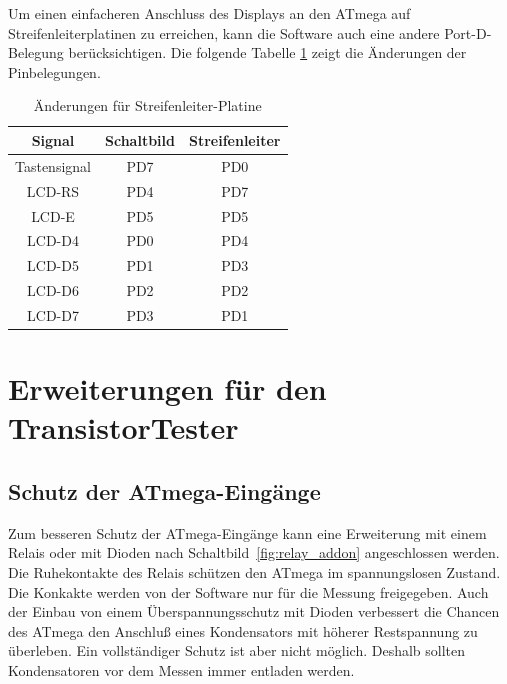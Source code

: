 Um einen einfacheren Anschluss des Displays an den ATmega auf Streifenleiterplatinen zu erreichen,
kann die Software auch eine andere Port-D-Belegung berücksichtigen.
Die folgende Tabelle \ref{tab:grid-change} zeigt die Änderungen der Pinbelegungen.

\begin{table}[H]
  \begin{center}
    \begin{tabular}{| c | c | c |}
    \hline
       Signal & Schaltbild & Streifenleiter\\
    \hline
    Tastensignal  &  PD7   &  PD0 \\
    LCD-RS    &  PD4      & PD7 \\
    LCD-E     &  PD5   & PD5 \\
    LCD-D4    &  PD0   & PD4 \\
    LCD-D5    &  PD1   & PD3 \\
    LCD-D6    &  PD2   & PD2 \\
    LCD-D7    &  PD3   & PD1 \\
    \hline
    \end{tabular}
  \end{center}
  \caption{Änderungen für Streifenleiter-Platine}
  \label{tab:grid-change}
\end{table}

\section{Erweiterungen für den TransistorTester}


\subsection{Schutz der ATmega-Eingänge}  

Zum besseren Schutz der ATmega-Eingänge kann eine Erweiterung mit einem Relais oder mit Dioden
nach Schaltbild~\ref{fig:relay_addon} angeschlossen werden.
Die Ruhekontakte des Relais schützen den ATmega im spannungslosen Zustand.
Die Konkakte werden von der Software nur für die Messung freigegeben.
Auch der Einbau von einem Überspannungsschutz mit Dioden verbessert die Chancen des ATmega
den Anschluß eines Kondensators mit höherer Restspannung zu überleben.
Ein vollständiger Schutz ist aber nicht möglich. Deshalb sollten Kondensatoren vor dem Messen immer
entladen werden.

